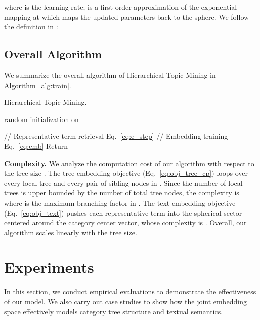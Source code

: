 \documentclass[sigconf]{acmart}
\theoremstyle{definition}
\begin{document}
where  is the learning rate;  is a first-order approximation of the exponential mapping at  which maps the updated parameters back to the sphere. We follow the definition in \cite{meng2019spherical}:


\subsection{Overall Algorithm}
We summarize the overall algorithm of Hierarchical Topic Mining in Algorithm~\ref{alg:train}.
\begin{algorithm}[h]
\caption{Hierarchical Topic Mining.}
\label{alg:train}

 random initialization on \;
\;
 \;

\While{}  {
\;
// Representative term retrieval\;
 Eq.~\eqref{eq:e_step}\;
// Embedding training\;
 Eq.~\eqref{eq:emb}\;
}
 {
\;
}
Return \;
\end{algorithm}

\noindent
\textbf{Complexity.} We analyze the computation cost of our algorithm with respect to the tree size . The tree embedding objective (Eq.~\eqref{eq:obj_tree_cp}) loops over every local tree  and every pair of sibling nodes in . Since the number of local trees is upper bounded by the number of total tree nodes, the complexity is  where  is the maximum branching factor in . The text embedding objective (Eq.~\eqref{eq:obj_text}) pushes each representative term into the spherical sector centered around the category center vector, whose complexity is . Overall, our algorithm scales linearly with the tree size.
 


 


\section{Experiments}
In this section, we conduct empirical evaluations to demonstrate the effectiveness of our model. We also carry out case studies to show how the joint embedding space effectively models category tree structure and textual semantics.
\end{document}
